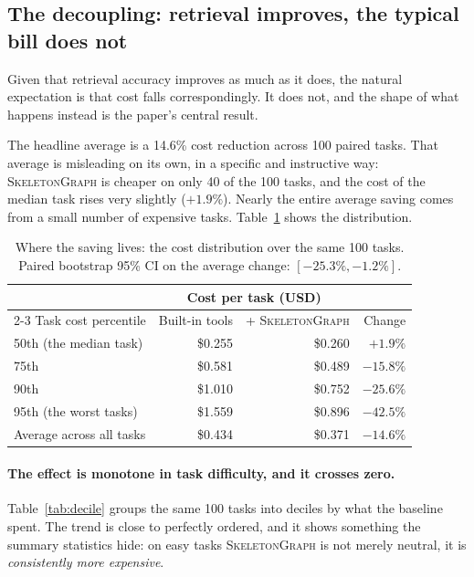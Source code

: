 \documentclass[11pt,letterpaper]{article}
\newcommand{\sg}{\textsc{SkeletonGraph}}
\begin{document}
\subsection{The decoupling: retrieval improves, the typical bill does not}
\label{sec:decoupling}
Given that retrieval accuracy improves as much as it does, the natural
expectation is that cost falls correspondingly. It does not, and the shape of
what happens instead is the paper's central result.

The headline average is a 14.6\% cost reduction across 100 paired tasks. That
average is misleading on its own, in a specific and instructive way: \sg{} is
cheaper on only 40 of the 100 tasks, and the cost of the median task rises very
slightly ($+1.9\%$). Nearly the entire average saving comes from a small number
of expensive tasks. Table~\ref{tab:tail} shows the distribution.

\begin{table}[t]
\centering
\begin{tabular}{lrrr}
\toprule
& \multicolumn{2}{c}{Cost per task (USD)} & \\
\cmidrule(lr){2-3}
Task cost percentile & Built-in tools & + \sg{} & Change \\
\midrule
50th (the median task) & \$0.255 & \$0.260 & $+1.9\%$ \\
75th                   & \$0.581 & \$0.489 & $-15.8\%$ \\
90th                   & \$1.010 & \$0.752 & $-25.6\%$ \\
95th (the worst tasks) & \$1.559 & \$0.896 & $-42.5\%$ \\
\midrule
Average across all tasks & \$0.434 & \$0.371 & $-14.6\%$ \\
\bottomrule
\end{tabular}
\caption{Where the saving lives: the cost distribution over the same 100 tasks.
Paired bootstrap 95\% CI on the average change: $[-25.3\%, -1.2\%]$.}
\label{tab:tail}
\end{table}

\paragraph{The effect is monotone in task difficulty, and it crosses zero.}
Table~\ref{tab:decile} groups the same 100 tasks into deciles by what the baseline
spent. The trend is close to perfectly ordered, and it shows something the summary
statistics hide: on easy tasks \sg{} is not merely neutral, it is
\emph{consistently more expensive}.
\end{document}
